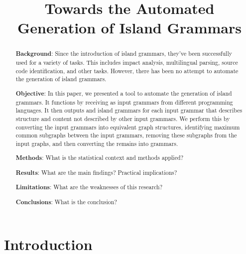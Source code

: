 \documentclass[conference,compsoc]{IEEEtran}
\begin{document}
\title{Towards the Automated Generation of Island Grammars}

\author{%
  }

\maketitle

\begin{abstract}
\textbf{Background}: Since the introduction of island grammars, they've
been successfully used for a variety of tasks. This includes impact
analysis, multilingual parsing, source code identification, and other
tasks. However, there has been no attempt to automate the generation of
island grammars.

\textbf{Objective}: In this paper, we presented a tool to automate the
generation of island grammars. It functions by receiving as input
grammars from different programming languages. It then outputs and
island grammars for each input grammar that describes structure and
content not described by other input grammars. We perform this by
converting the input grammars into equivalent graph structures,
identifying maximum common subgraphs between the input grammars,
removing these subgraphs from the input graphs, and then converting the
remains into grammars.

\textbf{Methods}: What is the statistical context and methods applied?

\textbf{Results}: What are the main findings? Practical implications?

\textbf{Limitations}: What are the weaknesses of this research?

\textbf{Conclusions}: What is the conclusion?
\end{abstract}

\begin{IEEEkeywords}

\end{IEEEkeywords}

\hypertarget{introduction}{%
\section{Introduction}\label{introduction}}
\end{document}
